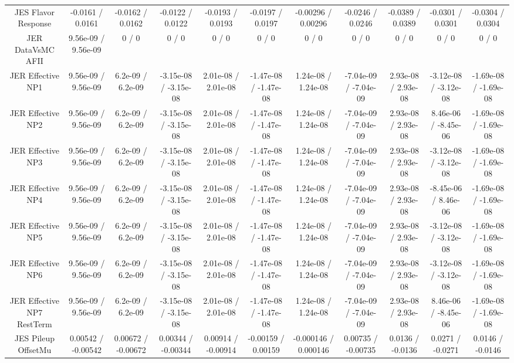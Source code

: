 \begin{table}[htbp]
\begin{center}
\begin{tabular}{|c|c|c|c|c|c|c|c|c|c|c|}
  JES Flavor Response & -0.0161 / 0.0161 & -0.0162 / 0.0162 & -0.0122 / 0.0122 & -0.0193 / 0.0193 & -0.0197 / 0.0197 & -0.00296 / 0.00296 & -0.0246 / 0.0246 & -0.0389 / 0.0389 & -0.0301 / 0.0301 & -0.0304 / 0.0304 \\ 
  JER DataVsMC AFII & 9.56e-09 / 9.56e-09 & 0 / 0 & 0 / 0 & 0 / 0 & 0 / 0 & 0 / 0 & 0 / 0 & 0 / 0 & 0 / 0 & 0 / 0 \\ 
  JER Effective NP1 & 9.56e-09 / 9.56e-09 & 6.2e-09 / 6.2e-09 & -3.15e-08 / -3.15e-08 & 2.01e-08 / 2.01e-08 & -1.47e-08 / -1.47e-08 & 1.24e-08 / 1.24e-08 & -7.04e-09 / -7.04e-09 & 2.93e-08 / 2.93e-08 & -3.12e-08 / -3.12e-08 & -1.69e-08 / -1.69e-08 \\ 
  JER Effective NP2 & 9.56e-09 / 9.56e-09 & 6.2e-09 / 6.2e-09 & -3.15e-08 / -3.15e-08 & 2.01e-08 / 2.01e-08 & -1.47e-08 / -1.47e-08 & 1.24e-08 / 1.24e-08 & -7.04e-09 / -7.04e-09 & 2.93e-08 / 2.93e-08 & 8.46e-06 / -8.45e-06 & -1.69e-08 / -1.69e-08 \\ 
  JER Effective NP3 & 9.56e-09 / 9.56e-09 & 6.2e-09 / 6.2e-09 & -3.15e-08 / -3.15e-08 & 2.01e-08 / 2.01e-08 & -1.47e-08 / -1.47e-08 & 1.24e-08 / 1.24e-08 & -7.04e-09 / -7.04e-09 & 2.93e-08 / 2.93e-08 & -3.12e-08 / -3.12e-08 & -1.69e-08 / -1.69e-08 \\ 
  JER Effective NP4 & 9.56e-09 / 9.56e-09 & 6.2e-09 / 6.2e-09 & -3.15e-08 / -3.15e-08 & 2.01e-08 / 2.01e-08 & -1.47e-08 / -1.47e-08 & 1.24e-08 / 1.24e-08 & -7.04e-09 / -7.04e-09 & 2.93e-08 / 2.93e-08 & -8.45e-06 / 8.46e-06 & -1.69e-08 / -1.69e-08 \\ 
  JER Effective NP5 & 9.56e-09 / 9.56e-09 & 6.2e-09 / 6.2e-09 & -3.15e-08 / -3.15e-08 & 2.01e-08 / 2.01e-08 & -1.47e-08 / -1.47e-08 & 1.24e-08 / 1.24e-08 & -7.04e-09 / -7.04e-09 & 2.93e-08 / 2.93e-08 & -3.12e-08 / -3.12e-08 & -1.69e-08 / -1.69e-08 \\ 
  JER Effective NP6 & 9.56e-09 / 9.56e-09 & 6.2e-09 / 6.2e-09 & -3.15e-08 / -3.15e-08 & 2.01e-08 / 2.01e-08 & -1.47e-08 / -1.47e-08 & 1.24e-08 / 1.24e-08 & -7.04e-09 / -7.04e-09 & 2.93e-08 / 2.93e-08 & -3.12e-08 / -3.12e-08 & -1.69e-08 / -1.69e-08 \\ 
  JER Effective NP7 RestTerm & 9.56e-09 / 9.56e-09 & 6.2e-09 / 6.2e-09 & -3.15e-08 / -3.15e-08 & 2.01e-08 / 2.01e-08 & -1.47e-08 / -1.47e-08 & 1.24e-08 / 1.24e-08 & -7.04e-09 / -7.04e-09 & 2.93e-08 / 2.93e-08 & 8.46e-06 / -8.45e-06 & -1.69e-08 / -1.69e-08 \\ 
  JES Pileup OffsetMu & 0.00542 / -0.00542 & 0.00672 / -0.00672 & 0.00344 / -0.00344 & 0.00914 / -0.00914 & -0.00159 / 0.00159 & -0.000146 / 0.000146 & 0.00735 / -0.00735 & 0.0136 / -0.0136 & 0.0271 / -0.0271 & 0.0146 / -0.0146 \\ 

\end{tabular}
\end{center}
\end{table}

